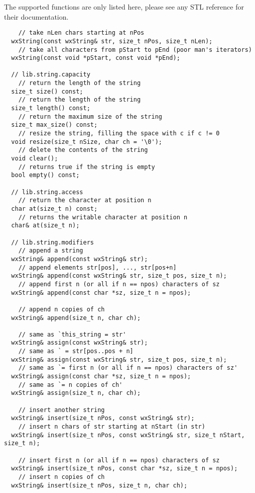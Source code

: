 {

The supported functions are only listed here, please see any STL reference for
their documentation.

\begin{verbatim}
    // take nLen chars starting at nPos
  wxString(const wxString& str, size_t nPos, size_t nLen);
    // take all characters from pStart to pEnd (poor man's iterators)
  wxString(const void *pStart, const void *pEnd);

  // lib.string.capacity
    // return the length of the string
  size_t size() const;
    // return the length of the string
  size_t length() const;
    // return the maximum size of the string
  size_t max_size() const;
    // resize the string, filling the space with c if c != 0
  void resize(size_t nSize, char ch = '\0');
    // delete the contents of the string
  void clear();
    // returns true if the string is empty
  bool empty() const;

  // lib.string.access
    // return the character at position n
  char at(size_t n) const;
    // returns the writable character at position n
  char& at(size_t n);

  // lib.string.modifiers
    // append a string
  wxString& append(const wxString& str);
    // append elements str[pos], ..., str[pos+n]
  wxString& append(const wxString& str, size_t pos, size_t n);
    // append first n (or all if n == npos) characters of sz
  wxString& append(const char *sz, size_t n = npos);

    // append n copies of ch
  wxString& append(size_t n, char ch);

    // same as `this_string = str'
  wxString& assign(const wxString& str);
    // same as ` = str[pos..pos + n]
  wxString& assign(const wxString& str, size_t pos, size_t n);
    // same as `= first n (or all if n == npos) characters of sz'
  wxString& assign(const char *sz, size_t n = npos);
    // same as `= n copies of ch'
  wxString& assign(size_t n, char ch);

    // insert another string
  wxString& insert(size_t nPos, const wxString& str);
    // insert n chars of str starting at nStart (in str)
  wxString& insert(size_t nPos, const wxString& str, size_t nStart, size_t n);

    // insert first n (or all if n == npos) characters of sz
  wxString& insert(size_t nPos, const char *sz, size_t n = npos);
    // insert n copies of ch
  wxString& insert(size_t nPos, size_t n, char ch);


\end{verbatim}}
